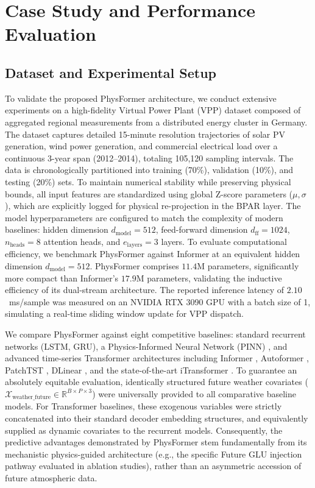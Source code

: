 \section{Case Study and Performance Evaluation}
\label{sec:experiments}

\subsection{Dataset and Experimental Setup}
\label{subsec:exp_setup}

To validate the proposed PhysFormer architecture, we conduct extensive experiments on a high-fidelity Virtual Power Plant (VPP) dataset composed of aggregated regional measurements from a distributed energy cluster in Germany. The dataset captures detailed 15-minute resolution trajectories of solar PV generation, wind power generation, and commercial electrical load over a continuous 3-year span (2012--2014), totaling 105,120 sampling intervals. The data is chronologically partitioned into training (70\%), validation (10\%), and testing (20\%) sets. To maintain numerical stability while preserving physical bounds, all input features are standardized using global Z-score parameters ($\mu, \sigma$), which are explicitly logged for physical re-projection in the BPAR layer. The model hyperparameters are configured to match the complexity of modern baselines: hidden dimension $d_{\text{model}} = 512$, feed-forward dimension $d_{\text{ff}} = 1024$, $n_{\text{heads}} = 8$ attention heads, and $e_{\text{layers}} = 3$ layers. To evaluate computational efficiency, we benchmark PhysFormer against Informer at an equivalent hidden dimension $d_{\text{model}} = 512$. PhysFormer comprises $11.4$M parameters, significantly more compact than Informer's $17.9$M parameters, validating the inductive efficiency of its dual-stream architecture. The reported inference latency of $2.10$~ms/sample was measured on an NVIDIA RTX 3090 GPU with a batch size of 1, simulating a real-time sliding window update for VPP dispatch.

We compare PhysFormer against eight competitive baselines: standard recurrent networks (LSTM, GRU), a Physics-Informed Neural Network (PINN) \cite{Raissi2019}, and advanced time-series Transformer architectures including Informer \cite{Zhou2021informer}, Autoformer \cite{Wu2021autoformer}, PatchTST \cite{Nie2023patchtst}, DLinear \cite{Zeng2023}, and the state-of-the-art iTransformer \cite{Liu2023itransformer}. To guarantee an absolutely equitable evaluation, identically structured future weather covariates ($\mathcal{X}_{\text{weather\_future}} \in \mathbb{R}^{B \times P \times 3}$) were universally provided to all comparative baseline models. For Transformer baselines, these exogenous variables were strictly concatenated into their standard decoder embedding structures, and equivalently supplied as dynamic covariates to the recurrent models. Consequently, the predictive advantages demonstrated by PhysFormer stem fundamentally from its mechanistic physics-guided architecture (e.g., the specific Future GLU injection pathway evaluated in ablation studies), rather than an asymmetric accession of future atmospheric data.

